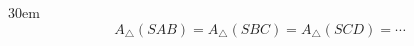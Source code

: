 \documentclass[border=4pt]{standalone}
\begin{document}
\begin{varwidth}{30em}
\large
\[ A_{\triangle}(SAB) = A_{\triangle}(SBC) = A_{\triangle}(SCD) = \cdots \]

\end{varwidth}
\end{document}
